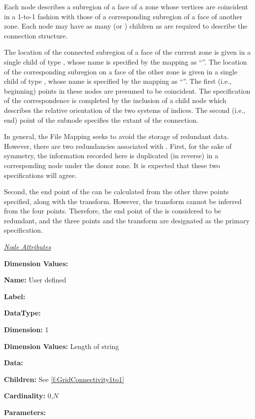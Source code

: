 Each  node describes a subregion
of a face of a zone whose vertices are coincident in a 1-to-1
fashion with those of a corresponding subregion of a face of another
zone. Each  node may have as many
 (or ) children
as are required to describe the connection structure.

The location of the connected subregion of a face of the current zone
is given in a single child of type , whose name
is specified by the mapping as ``''. The location of
the corresponding subregion on a face of the other zone is given in
a single child of type , whose name is specified
by the mapping as ``''. The first (i.e.,
beginning) points in these  nodes are presumed to be
coincident. The specification of the correspondence is completed by the
inclusion of a  child node which describes the relative
orientation of the two systems of indices. The second (i.e., end) point
of the  subnode specifies the extant of the connection.

In general, the File Mapping seeks to avoid the storage of
redundant data. However, there are two redundancies associated with
. First, for the sake of symmetry, the
information recorded here is duplicated (in reverse) in a corresponding
node under the donor zone. It is expected that these two specifications
will agree.

Second, the end point of the  can be
calculated from the other three points specified, along with the
transform. However, the transform cannot be inferred from the four
points. Therefore, the end point of the  is
considered to be redundant, and the three points and the transform are
designated as the primary specification.

\textit{\uline{Node Attributes}}
\begin{Ventryic}{\textbf{Dimension Values:}}
\item [\textbf{Name:}]
      User defined
\item [\textbf{Label:}]
\item [\textbf{DataType:}]
\item [\textbf{Dimension:}]
      1
\item [\textbf{Dimension Values:}]
      Length of string
\item [\textbf{Data:}]
\item [\textbf{Children:}]
      See \autoref{f:GridConnectivity1to1}
\item [\textbf{Cardinality:}]
      0,$N$
\item [\textbf{Parameters:}]
\end{Ventryic}

